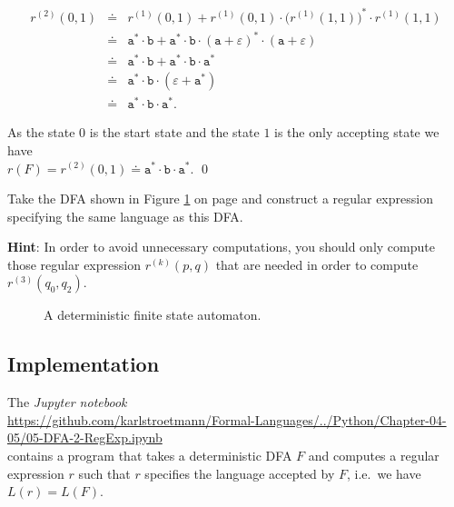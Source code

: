 \begin{enumerate}
            \begin{eqnarray*}
                  r^{(2)}(0, 1)
            & \doteq & r^{(1)}(0, 1) + 
                  r^{(1)}(0, 1) \cdot \bigl(r^{(1)}(1, 1)\bigr)^* \cdot r^{(1)}(1, 1) \\
            & \doteq & \texttt{a}^* \cdot \texttt{b} + 
                  \texttt{a}^* \cdot \texttt{b} \cdot (\texttt{a} + \varepsilon)^* \cdot (\texttt{a} + \varepsilon) \\
            & \doteq & \texttt{a}^* \cdot \texttt{b} + \texttt{a}^* \cdot \texttt{b} \cdot \texttt{a}^* \\
            & \doteq & \texttt{a}^* \cdot \texttt{b} \cdot (\varepsilon + \texttt{a}^*) \\
            & \doteq & \texttt{a}^* \cdot \texttt{b} \cdot \texttt{a}^*.
        \end{eqnarray*}
\end{enumerate}
As the state 0 is the start state and the state $1$ is the only accepting state we have
\\[0.2cm]
\hspace*{1.3cm}
$r(F) = r^{(2)}(0, 1) \doteq \texttt{a}^* \cdot \texttt{b} \cdot \texttt{a}^*$.
\qed


\exerciseEng
Take the \textsc{DFA} shown in Figure \ref{fig:exercise-13.eps} on page
\pageref{fig:exercise-13.eps} and construct a regular expression specifying the same language as this
\textsc{DFA}.
\vspace*{0.1cm}

\noindent
\textbf{Hint}: In order to avoid unnecessary computations, you should only compute those regular expression
$r^{(k)}(p, q)$ that are needed in order to compute $r^{(3)}(q_0, q_2)$. 
\eox

\begin{figure}[!ht]
  \centering
{}
\caption{A deterministic finite state automaton.}
\label{fig:exercise-13.eps}
\end{figure}

\subsection{Implementation}
The \textsl{Jupyter notebook} 
\\[0.2cm]
\hspace*{-0.3cm}
\href{https://github.com/karlstroetmann/Formal-Languages/blob/master/Python/Chapter-04-05/05-DFA-2-RegExp.ipynb}{https://github.com/karlstroetmann/Formal-Languages/../Python/Chapter-04-05/05-DFA-2-RegExp.ipynb}
\\[0.2cm]
contains a program that takes a deterministic \textsc{DFA} $F$ and computes a regular expression $r$ such that
$r$ specifies the language accepted by $F$, i.e.~we have $L(r) = L(F)$.

